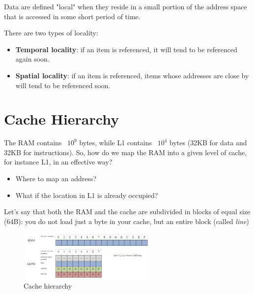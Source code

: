 \begin{definitionblock}
    Data are defined "local" when they reside in a small portion of the address space that is accessed in some short period of time.

    There are two types of locality:
    \begin{itemize}
        \item \textbf{Temporal locality}: if an item is referenced, it will tend to be referenced again soon.
        \item \textbf{Spatial locality}: if an item is referenced, items whose addresses are close by will tend to be referenced soon.
    \end{itemize}
\end{definitionblock}





\newpage
\section{Cache Hierarchy}

The RAM contains ~$10^9$ bytes, while L1 contains ~$10^4$ bytes (32KB for data and 32KB for instructions). So, how do we map the RAM into a given level of cache, for instance L1, in an effective way?

\begin{itemize}
    \item Where to map an address?
    \item What if the location in L1 is already occupied?
\end{itemize}

Let's say that both the RAM and the cache are subdivided in blocks of equal size (64B): you do not load just a byte in your cache, but an entire block (called \textit{line})
\begin{figure}[H]
    \centering
    \includegraphics[width=0.6\textwidth]{assets/opt5.png}
    \caption{Cache hierarchy}
\end{figure}


